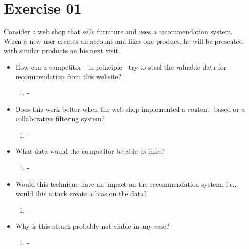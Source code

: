 \documentclass[11pt,a4paper]{scrartcl}
\begin{document}
\section*{Exercise 01}	

	Consider a web shop that sells furniture and uses a recommendation system. 
	When a new user creates an account and likes one product, he will be presented with similar products on his next visit.

\begin{itemize}
\item[]How can a competitor - in principle - try to steal the valuable data for recommendation from this website?
	\begin{enumerate}
		\item -
	\end{enumerate}

\item[]Does this work better when the web shop implemented a content- based or a collaborative filtering system?
	\begin{enumerate}
		\item -
	\end{enumerate}

\item[]What data would the competitor be able to infer?
	\begin{enumerate}
		\item -
	\end{enumerate}
\item[]Would this technique have an impact on the recommendation system, i.e., would this attack create a bias on the data?
	\begin{enumerate}
		\item -
	\end{enumerate}
\item[]Why is this attack probably not viable in any case?
	\begin{enumerate}
		\item -
	\end{enumerate}
\end{itemize}
\end{document}
